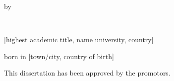 \begin{titlepage}
\begin{center}
    \bigskip
    \bigskip

    by

    \bigskip
    \bigskip

    \makeatletter
    {\Large\titlefont\bfseries\@firstnames\ \MakeUppercase{\titleshape\@lastname}}
    \makeatother

    \bigskip
    \bigskip

    [highest academic title, name university, country]

    born in [town/city, country of birth]

    \vspace*{2\bigskipamount}

\end{center}

\clearpage
\thispagestyle{empty}

\noindent This dissertation has been approved by the promotors.


\end{titlepage}
